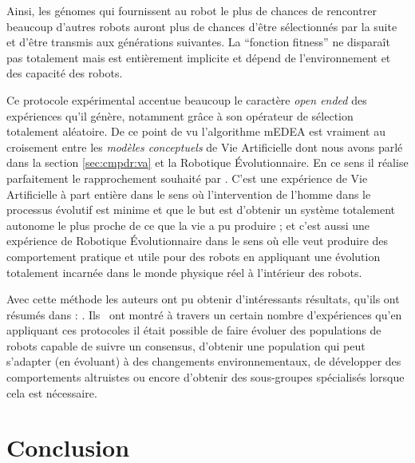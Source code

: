 Ainsi, les génomes qui fournissent au robot le plus de chances de rencontrer beaucoup d'autres robots auront plus de chances d'être sélectionnés par la suite et d'être transmis aux générations suivantes. La ``fonction fitness'' ne disparaît pas totalement mais est entièrement implicite et dépend de l'environnement et des capacité des robots.

Ce protocole expérimental accentue beaucoup le caractère \emph{open ended} des expériences qu'il génère, notamment grâce à son opérateur de sélection totalement aléatoire. De ce point de vu l'algorithme mEDEA est vraiment au croisement entre les \emph{modèles conceptuels} de Vie Artificielle dont nous avons parlé dans la section \ref{sec:cmpdr:va} et la Robotique \'Evolutionnaire. En ce sens il réalise parfaitement le rapprochement souhaité par \cite{watson02embodiedevolutiondistributingevolutionaryalgorithmpopulationrobots}. C'est une expérience de Vie Artificielle à part entière dans le sens où l'intervention de l'homme dans le processus évolutif est minime et que le but est d'obtenir un système totalement autonome le plus proche de ce que la vie a pu produire ; et c'est aussi une expérience de Robotique \'Evolutionnaire dans le sens où elle veut produire des comportement pratique et utile pour des robots en appliquant une évolution totalement incarnée dans le monde physique réel à l'intérieur des robots.

Avec cette méthode les auteurs ont pu obtenir d'intéressants résultats, qu'ils ont résumés dans : \cite{bredeche2012environmentdrivenopenende}. Ils  ont montré à travers un certain nombre d'expériences qu'en appliquant ces protocoles il était possible de faire évoluer des populations de robots capable de suivre un consensus, d'obtenir une population qui peut s'adapter (en évoluant) à des changements environnementaux, de développer des comportements altruistes ou encore d'obtenir des sous-groupes spécialisés lorsque cela est nécessaire.


\section{Conclusion}

